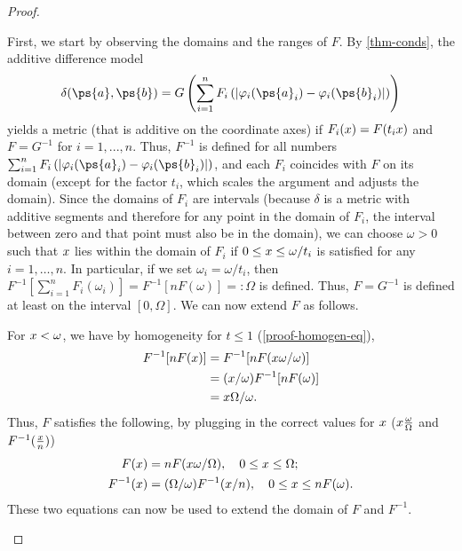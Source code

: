 \begin{proof}
\begin{proofpart}
		First, we start by observing the domains and the ranges of $F$.
		By \cref{thm-conds}, the additive difference model
		\begin{equation*}
			\delta(\ps{a}, \ps{b}) = G \left( \sum_{i=1}^{n} F_i \left( |\varphi_i(\ps{a}_i) - \varphi_i(\ps{b}_i)| \right) \right)
		\end{equation*}
		yields a metric (that is additive on the coordinate axes) if $F_i(x) = F(t_i x)$ and $F = G^{-1}$ for $i=1, ..., n$. Thus, $F^{-1}$ is defined for all numbers $\sum_{i=1}^{n} F_i \left( |\varphi_i(\ps{a}_i) - \varphi_i(\ps{b}_i)| \right)$, and each $F_i$ coincides with $F$ on its domain (except for the factor $t_i$, which scales the argument and adjusts the domain).
		Since the domains of $F_i$ are intervals (because $\delta$ is a metric with additive segments and therefore for any point in the domain of $F_i$, the interval between zero and that point must also be in the domain), we can choose $\omega > 0$ such that $x$ lies within the domain of $F_i$ if $0 \leq x \leq \omega/t_i$ is satisfied for any $i = 1, \ldots, n$.
		In particular, if we set $\omega_i = \omega/t_i$, then $F^{-1} \left[ \sum_{i=1}^{n} F_i(\omega_i) \right] = F^{-1} \left[ nF(\omega) \right] =: \Omega$ is defined. Thus, $F = G^{-1}$ is defined at least on the interval $[0, \Omega]$. We can now extend $F$ as follows.
	\end{proofpart}
	\begin{proofpart}
		For $x < \omega$, we have by homogeneity for $t \leq 1$ (\cref{proof-homogen-eq}),
		\begin{align*}
			F^{-1}[nF(x)] & = F^{-1}[nF(x \omega/\omega)]   \\
			                & = (x/\omega) F^{-1}[nF(\omega)] \\
			                & = x \Omega/\omega.
		\end{align*}
		Thus, $F$ satisfies the following, by plugging in the correct values for $x$ ($x \frac{\omega}{\Omega}$ and $F^{-1}( \frac{x}{n} )$)
		\begin{align}
			F(x)      & = nF(x \omega/\Omega), \quad 0 \leq x \leq \Omega; \label{proof-f-erw}               \\
			F^{-1}(x) & = (\Omega/\omega) F^{-1}(x/n), \quad 0 \leq x \leq nF(\omega). \label{proof-f-1-erw}
		\end{align}
		These two equations can now be used to extend the domain of $F$ and $F^{-1}$.


\end{proofpart}
\end{proof}
